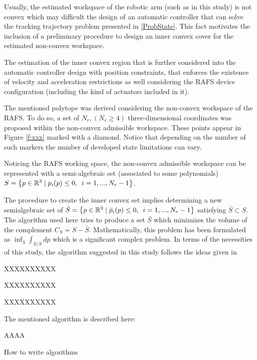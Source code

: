 \documentclass[journal,twocolumn]{IEEEtran}
\begin{document}
Usually, the estimated workspace of the robotic arm (such as in this study) is not convex which may difficult the design of an automatic controller that can solve the tracking trajectory problem presented in \eqref{ProbState}. This fact motivates the inclusion of a preliminary procedure to design an inner convex cover for the estimated non-convex workspace. 

The estimation of the inner convex region that is further considered into the automatic controller design with position constraints, that enforces the existence of velocity and acceleration restrictions as well considering the RAFS device configuration (including the kind of actuators included in it).  





The mentioned polytope was derived considering the non-convex workspace of the RAFS. To do so, a set of $N_r, (N_r \geq 4)$ three-dimensional coordinates was proposed within the non-convex admissible workspace. These points appear in Figure \ref{f:xxx} marked with a diamond. Notice that depending on the number of such markers the number of developed state limitations can vary. 

Noticing the RAFS working space, the non-convex admissible workspace can be represented with a semi-algebraic set (associated to some polynomials) $ S= \left\lbrace p \in \mathbb{R}^{3} \mid p_{i}(p) \leq 0, \enskip i=1,...,N_r-1  \right\rbrace $.

The procedure to create the inner convex set implies determining a new semialgebraic set of $ \bar{S}= \left\lbrace p \in \mathbb{R}^{3} \mid \bar{p}_{i}(p) \leq 0, \enskip i=1,...,N_r-1  \right\rbrace $ satisfying $\bar{S} \subset S$. The algorithm used here tries to produce a set $\bar{S}$ which minimizes the volume of the complement $C_{S}=S-\bar{S}$. Mathematically, this problem has been formulated as $\inf_{\bar{S}} \int_{S / \bar{S}  } dp$ which is a significant complex problem. In terms of the necessities of this study, the algorithm suggested in this study follows the ideas given in \cite{}  


XXXXXXXXXX

XXXXXXXXXX

XXXXXXXXXX

The mentioned algorithm is described here:
%
\begin{algorithm}
    AAAA
    \caption{How to write algorithms}
\end{algorithm}
\end{document}
